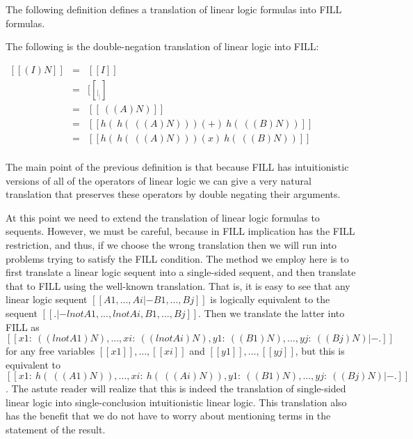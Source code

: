 The following definition defines a translation of linear logic formulas into FILL formulas.
\begin{definition}
  \label{def:ll-to-fill}
  The following is the double-negation translation of linear logic
  into FILL:
  \begin{center}
  \begin{math}
    \begin{array}{lll}
      [[(I)N]] & = & [[I]]\\
      [[(_|_)N]] & = & [[_|_]]\\
      [[(lnot A)N]] & = & [[~((A)N)]]\\
      [[(A (+) B)N]] & = & [[h(~h(~((A)N))) (+) ~h(~((B)N))]]\\
      [[(A (x) B)N]] & = & [[h(~h(~((A)N))) (x) ~h(~((B)N))]]\\
    \end{array}
  \end{math}
\end{center}
\end{definition}
\noindent
The main point of the previous definition is that because FILL has
intuitionistic versions of all of the operators of linear logic we can
give a very natural translation that preserves these operators by
double negating their arguments.  

At this point we need to extend the translation of linear logic
formulas to sequents.  However, we must be careful, because in FILL
implication has the FILL restriction, and thus, if we choose the wrong
translation then we will run into problems trying to satisfy the FILL
condition.  The method we employ here is to first translate a linear
logic sequent into a single-sided sequent, and then translate that to
FILL using the well-known translation.  That is, it is easy to see
that any linear logic sequent $[[A1,...,Ai |- B1,...,Bj]]$ is
logically equivalent to the sequent $[[. |- lnot A1,...,lnot
    Ai,B1,...,Bj]]$.  Then we translate the latter into FILL as
$[[x1 : ~((lnot A1)N),...,xi : ~((lnot Ai)N),y1 : ~((B1)N),...,yj : ~((Bj)N) |- .]]$
for any free variables $[[x1]],\ldots,[[xi]]$ and
$[[y1]],\ldots,[[yj]]$, but this is equivalent to
$[[x1 : ~h(~((A1)N)),...,xi : ~h(~((Ai)N)),y1 : ~((B1)N),...,yj :~((Bj)N) |- .]]$.
The astute reader will realize that this is indeed the translation of
single-sided linear logic into single-conclusion intuitionistic linear
logic.  This translation also has the benefit that we do not have to
worry about mentioning terms in the statement of the result.


